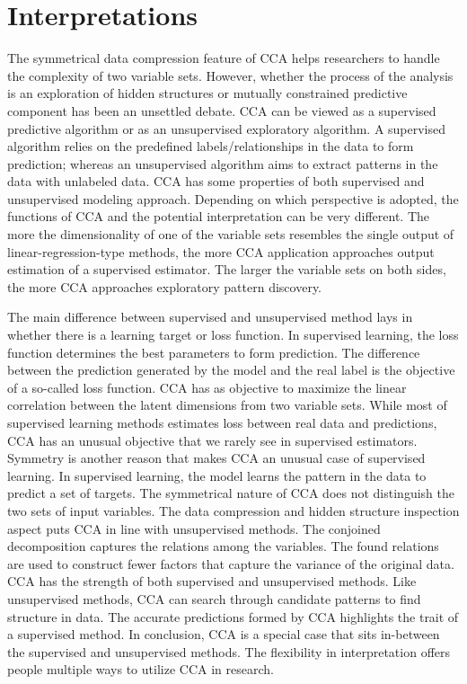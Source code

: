 \section{Interpretations}
\label{cca:interpretations}
The symmetrical data compression feature of CCA helps researchers to handle the complexity of two variable sets. However, whether the process of the analysis is an exploration of hidden structures or mutually constrained predictive component has been an unsettled debate. CCA can be viewed as a supervised predictive algorithm or as an unsupervised exploratory algorithm. A supervised algorithm relies on the predefined labels/relationships in the data to form prediction; whereas an unsupervised algorithm aims to extract patterns in the data with unlabeled data. CCA has some properties of both supervised and unsupervised modeling approach. Depending on which perspective is adopted, the functions of CCA and the potential interpretation can be very different.  The more the dimensionality of one of the variable sets resembles the single output of linear-regression-type methods, the more CCA application approaches output estimation of a supervised estimator. The larger the variable sets on both sides, the more CCA approaches exploratory pattern discovery.

The main difference between supervised and unsupervised method lays in whether there is a learning target or loss function. In supervised learning, the loss function determines the best parameters to form prediction. The difference between the prediction generated by the model and the real label is the objective of a so-called loss function. CCA has as objective to maximize the linear correlation between the latent dimensions from two variable sets. While most of supervised learning methods estimates loss between real data and predictions, CCA has an unusual objective that we rarely see in supervised estimators.  Symmetry is another reason that makes CCA an unusual case of supervised learning. In supervised learning, the model learns the pattern in the data to predict a set of targets. The symmetrical nature of CCA does not distinguish the two sets of input variables. The data compression and hidden structure inspection aspect puts CCA in line with unsupervised methods. The conjoined decomposition captures the relations among the variables. The found relations are used to construct fewer factors that capture the variance of the original data. CCA has the strength of both supervised and unsupervised methods. Like unsupervised methods, CCA can search through candidate patterns to find structure in data. The accurate predictions formed by CCA highlights the trait of a supervised method. In conclusion, CCA is a special case that sits in-between the supervised and unsupervised methods. The flexibility in interpretation offers people multiple ways to utilize CCA in research.

